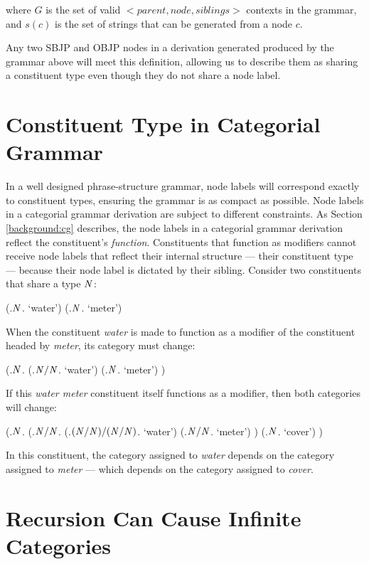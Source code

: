 \documentclass{article}
\newcommand{\cf}[1]{\mbox{$\it{#1}$}}   %
\begin{document}
where $G$ is the set of valid $<parent, node, siblings>$ contexts in the grammar, and $s(c)$ is the set of strings that can be generated from a node $c$.

Any two SBJP and OBJP nodes in a derivation generated produced by the grammar above will meet this definition, allowing us to describe them as sharing a constituent type even though they do not share a node label.

\section{Constituent Type in Categorial Grammar}

In a well designed phrase-structure grammar, node labels will correspond exactly to constituent types, ensuring the grammar is as compact as possible. Node labels in a categorial grammar derivation are subject to different constraints. As Section \ref{background:cg} describes, the node labels in a categorial grammar derivation reflect the constituent's \emph{function}. Constituents that function as modifiers cannot receive node labels that reflect their internal structure --- their constituent type --- because their node label is dictated by their sibling. Consider two constituents that share a type \cf{N}:

\begin{parsetree}
(.\cf{N}. `water')
(.\cf{N}.  `meter')
\end{parsetree}

When the constituent \emph{water} is made to function as a modifier of the constituent headed by \emph{meter}, its category must change:

\begin{parsetree}
(.\cf{N}.
  (.\cf{N/N}. `water')
  (.\cf{N}.  `meter')
)
\end{parsetree}

If this \emph{water meter} constituent itself functions as a modifier, then both categories will change:

\begin{parsetree}
(.\cf{N}.
  (.\cf{N/N}.
    (.\cf{(N/N)/(N/N)}. `water')
    (.\cf{N/N}.  `meter')
  )
  (.\cf{N}. `cover')
)
\end{parsetree}

In this constituent, the category assigned to \emph{water} depends on the category assigned to \emph{meter} --- which depends on the category assigned to \emph{cover}.

\section{Recursion Can Cause Infinite Categories}
\end{document}
